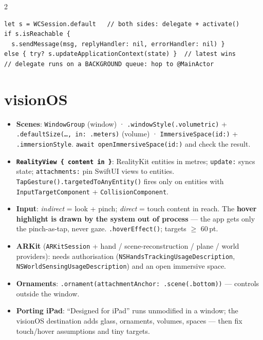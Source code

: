 \documentclass[8pt]{extarticle}
\begin{document}
\begin{multicols}{2}
\begin{lstlisting}[language=SwiftSheet]
let s = WCSession.default   // both sides: delegate + activate()
if s.isReachable {
  s.sendMessage(msg, replyHandler: nil, errorHandler: nil) }
else { try? s.updateApplicationContext(state) }  // latest wins
// delegate runs on a BACKGROUND queue: hop to @MainActor
\end{lstlisting}

\section{visionOS}
\begin{itemize}
  \item \textbf{Scenes}: \texttt{WindowGroup} (window) · \texttt{.windowStyle(.volumetric)} + \texttt{.defaultSize(\ldots, in: .meters)}
        (volume) · \texttt{ImmersiveSpace(id:)} + \texttt{.immersionStyle}. \texttt{await openImmersiveSpace(id:)} and check the result.
  \item \textbf{\texttt{RealityView \{ content in \}}}: RealityKit entities in metres; \texttt{update:} syncs state;
        \texttt{attachments:} pin SwiftUI views to entities. \texttt{TapGesture().targetedToAnyEntity()} fires only on
        entities with \texttt{InputTargetComponent} + \texttt{CollisionComponent}.
  \item \textbf{Input}: \emph{indirect} = look + pinch; \emph{direct} = touch content in reach. The \textbf{hover highlight
        is drawn by the system out of process} — the app gets only the pinch-as-tap, never gaze.
        \texttt{.hoverEffect()}; targets $\geq$ 60\,pt.
  \item \textbf{ARKit} (\texttt{ARKitSession} + hand / scene-reconstruction / plane / world providers): needs
        authorisation (\texttt{NSHandsTrackingUsageDescription}, \texttt{NSWorldSensingUsageDescription}) and an
        open immersive space.
  \item \textbf{Ornaments}: \texttt{.ornament(attachmentAnchor: .scene(.bottom))} — controls outside the window.
  \item \textbf{Porting iPad}: ``Designed for iPad'' runs unmodified in a window; the visionOS destination adds glass,
        ornaments, volumes, spaces — then fix touch/hover assumptions and tiny targets.
\end{itemize}


\end{multicols}
\end{document}
